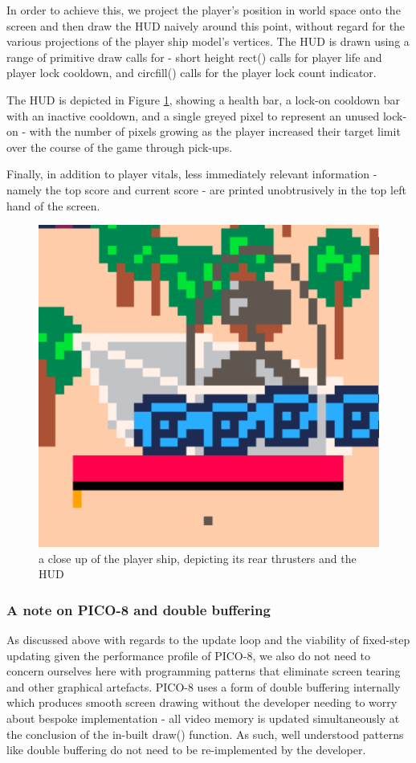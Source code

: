 \documentclass[11pt]{article}
\begin{document}
In order to achieve this, we project the player's position in world space onto the screen and then draw
the HUD naively around this point, without regard for the various projections of the player ship model's
vertices. The HUD is drawn using a range of primitive draw calls for - short height rect() calls for
player life and player lock cooldown, and circfill() calls for the player lock count indicator.

The HUD is depicted in Figure \ref{fig:ship}, showing a health bar, a lock-on cooldown bar with an
inactive cooldown, and
a single greyed pixel to represent an unused lock-on - with the number of pixels growing as the
player increased their target limit over the course of the game through pick-ups.

Finally, in addition to player vitals, less immediately relevant information - namely the top
score and current score - are printed unobtrusively in the top left hand of the screen.

\begin{figure}[h]
    \centering
    \includegraphics[width=.8\textwidth]{hud}
    \caption{a close up of the player ship, depicting its rear thrusters and the HUD}
    \label{fig:ship}
\end{figure}

\subsubsection*{A note on PICO-8 and double buffering}

As discussed above with regards to the update loop and the viability of fixed-step updating given
the performance profile of PICO-8, we also do not need to concern ourselves here with programming
patterns that eliminate screen tearing and other graphical artefacts. PICO-8 uses a form of double
buffering internally which produces smooth screen drawing without the developer needing to worry about
bespoke implementation - all video memory is updated simultaneously at the conclusion of the
in-built \textunderscore draw() function. As such, well understood patterns like double
buffering\cite[p. 107]{nystrom} do not need to be re-implemented by the developer.
\end{document}

